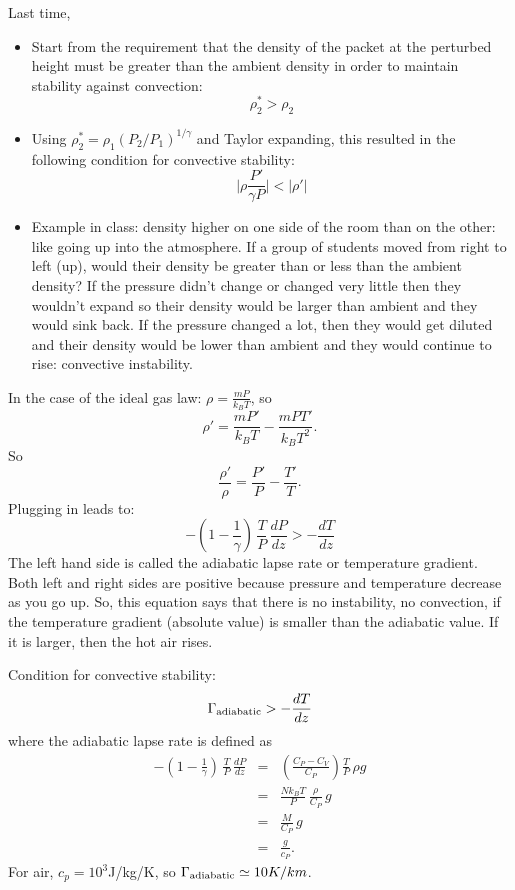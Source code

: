 \documentclass[11pt]{book}
\def\be{\begin{equation}}
\def\ee{\end{equation}}
\def\bea{\begin{eqnarray}}
\def\eea{\end{eqnarray}}
\newcommand{\vs}{\nonumber\\}
\newcommand{\eql}[1]{\label{eq:#1}}
\newcommand\bei{\begin{itemize}}
\newcommand\eei{\end{itemize}}
\begin{document}
Last time, 
\bei
\item Start from the requirement that the density of the packet at the perturbed height must be greater than the ambient density in order to maintain stability against convection:
\be
\rho_2^* > \rho_2
\ee
\item Using $\rho_2^* = \rho_1 (P_2/P_1)^{1/\gamma}$ and Taylor expanding, this resulted in
 the following condition for convective stability:
\be
 \vert \rho\frac{P'}{\gamma P} \vert < \vert{\rho'}\vert\ee
\item Example in class: density higher on one side of the room than on the other: like going up into the atmosphere. If a group of students moved from right to left (up), would their density be greater than or less than the ambient density? If the pressure didn't change or changed very little then they wouldn't expand so their density would be larger than ambient and they would sink back. If the pressure changed a lot, then they would get diluted and their density would be lower than ambient and they would continue to rise: convective instability. 
\eei


In the case of the ideal gas law: $\rho= \frac{mP}{k_BT}$, so
\be
\rho' = \frac{mP'}{k_BT} - \frac{mPT'}{k_BT^2} 
.\ee
So \be
\frac{\rho'}{\rho} =  \frac{P'}{P} - \frac{T'}{T} .\ee
Plugging in leads to:
\be
-\left(1-\frac{1}{\gamma}\right)\, \frac{T}{P}\, \frac{dP}{dz} > -\frac{dT}{dz}\eql{conveq}
\ee
The left hand side is called the adiabatic lapse rate or temperature gradient. Both left and right sides are positive because pressure and temperature decrease as you go up.
So, this equation says that there is no instability, no convection, if the temperature gradient (absolute value) is smaller than the adiabatic value. If it is larger, then the hot air rises.


Condition for convective stability:
\be
\Gamma_{\rm adiabatic} > -\frac{dT}{dz}\ee
where the adiabatic lapse rate is defined as
\bea
-\left(1-\frac{1}{\gamma}\right)\, \frac{T}{P}\, \frac{dP}{dz} &=& \left(\frac{C_P-C_V}{C_P}\right) \frac{T}{P}\, \rho g
\vs
&=&
 \frac{Nk_BT}{P}\, \frac{\rho}{C_P}\, g
\vs
&=&
\frac{M}{C_P}\,g\vs&=&
\frac{g}{c_P}.\eea
For air, $c_p=10^3$J/kg/K, so
$\Gamma_{\rm adiabatic} \simeq 10K/km$. 
\end{document}
